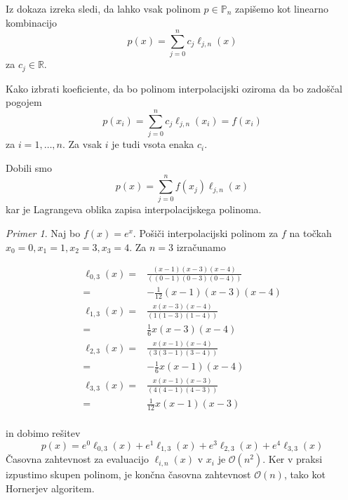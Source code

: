 \documentclass[a4paper,12pt]{article}
\theoremstyle{definition}
\theoremstyle{remark}
\newtheorem*{ex}{Primer}
\newcommand{\R}{\mathbb{R}}
\newcommand{\Pp}{\mathbb{P}}
\begin{document}
Iz dokaza izreka sledi, da lahko vsak polinom $p \in \Pp_n$ zapišemo kot linearno kombinacijo
\begin{equation*}
    p(x) = \sum_{j = 0}^{n} c_j \ell_{j, n} (x)
\end{equation*}
za $c_j \in \R$.

Kako izbrati koeficiente, da bo polinom interpolacijski oziroma da bo zadoščal pogojem
\begin{equation*}
    p(x_i) = \sum_{j = 0}^{n} c_j \ell_{j, n} (x_i) = f(x_i)
\end{equation*}
za $i = 1, \dots, n$. Za vsak $i$ je tudi vsota enaka $c_i$.

Dobili smo
\begin{equation*}
    p(x) = \sum_{j = 0}^{n} f(x_j) \ell_{j, n}(x)
\end{equation*}
kar je Lagrangeva oblika zapisa interpolacijskega polinoma.

\begin{ex}
    Naj bo $f(x) = e^x$. Pošiči interpolacijski polinom za $f$ na točkah $x_0 = 0, x_1 = 1, x_2 = 3, x_3 = 4$.
    Za $n = 3$ izračunamo

    \begin{align*}
        \ell_{0, 3}(x) =& \frac{(x-1)(x-3)(x-4)}{((0-1)(0-3)(0-4))} \\
                       =& -\frac{1}{12}(x-1)(x-3)(x-4) \\
        \ell_{1, 3}(x) =& \frac{x(x-3)(x-4)}{(1(1-3)(1-4))} \\
                       =& \frac{1}{6} x(x-3)(x-4) \\
        \ell_{2, 3}(x) =& \frac{x(x-1)(x-4)}{(3(3-1)(3-4))} \\
                       =& -\frac{1}{6} x(x-1)(x-4) \\
        \ell_{3, 3}(x) =& \frac{x(x-1)(x-3)}{(4(4-1)(4-3))} \\
                       =& \frac{1}{12} x(x-1)(x-3) \\
    \end{align*}

    in dobimo rešitev
    \begin{equation*}
        p(x) = e^0 \ell_{0, 3}(x) + e^1 \ell_{1, 3}(x) + e^3 \ell_{2, 3} (x) + e^4 \ell_{3, 3}(x)
    \end{equation*}
    Časovna zahtevnost za evaluacijo $\ell_{i, n}(x)$ v $x_i$ je $\mathcal{O}(n^2)$. Ker v praksi izpustimo skupen polinom,
    je končna časovna zahtevnost $\mathcal{O}(n)$, tako kot Hornerjev algoritem.
\end{ex}
\end{document}
